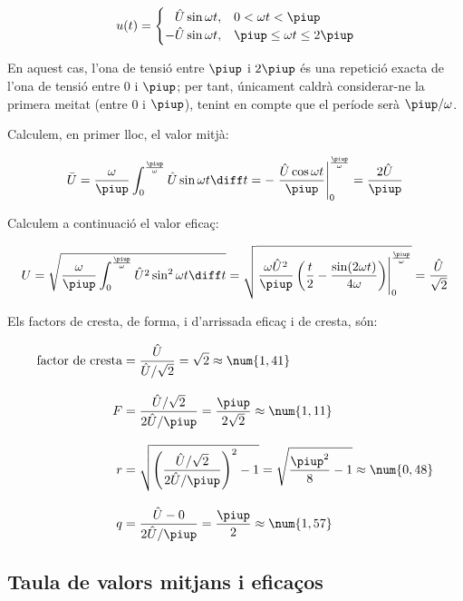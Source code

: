 \begin{exemple}[\FactorsCrestaFormaArr{}]
    \[
    u(t) = \begin{cases} \phantom{-}\hat{U} \sin\omega t, & 0 < \omega t < \piup\\
           -\hat{U} \sin\omega t, & \piup \leq \omega t \leq 2\piup \end{cases}
    \]

    En aquest cas, l'ona de tensió entre $\piup$ i $2\piup$ és una repetició
    exacta de l'ona de tensió entre 0 i $\piup$; per tant, únicament
    caldrà considerar-ne la primera meitat (entre 0 i $\piup$), tenint en
    compte que el període serà $\piup/\omega$.

     Calculem, en primer lloc, el valor mitjà:
     
     \[
    \bar{U} = \frac{\omega}{\piup} \int_0^\frac{\piup}{\omega} \hat{U}
    \sin\omega t \diff t  = - \left. \frac{\hat{U} \cos\omega t}{\piup}
    \right|_0^\frac{\piup}{\omega} = \frac{2 \hat{U}}{\piup}
    \]

    Calculem a continuació el valor eficaç:
    
    \[
    U = \sqrt{\frac{\omega}{\piup} \int_0^\frac{\piup}{\omega} \hat{U}^2
    \sin^2\omega t \diff t } =   \sqrt{\left.\frac{\omega
    \hat{U}^2}{\piup}\left( \frac{t}{2} - \frac{\sin (2\omega t)}{4\omega}
    \right)\right|_0^\frac{\piup}{\omega}}  = \frac{\hat{U}}{\sqrt{2}}
    \]

    Els factors de cresta, de forma, i d'arrissada eficaç i de cresta, són:
    
    \begin{align*}
        \text{factor de cresta} &= \frac{\hat{U}}{\hat{U}/\sqrt{2}} = \sqrt{2} \approx\num{1,41} \\[2ex]
        F &= \frac{\hat{U}/\sqrt{2}}{2 \hat{U}/\piup} =\frac{\piup}{2\sqrt{2}} \approx
        \num{1,11} \\[2ex]
    r &= \sqrt{\left(\frac{\hat{U}/\sqrt{2}}{2 \hat{U}/\piup}\right)^2-1}
    = \sqrt{\frac{\piup^2}{8}-1} \approx \num{0,48}\\[2ex]
    q &=  \frac{\hat{U} - 0}{2 \hat{U}/\piup} = \frac{\piup}{2} \approx \num{1,57}
    \end{align*}
\end{exemple}


\subsection{Taula de valors mitjans i eficaços}

